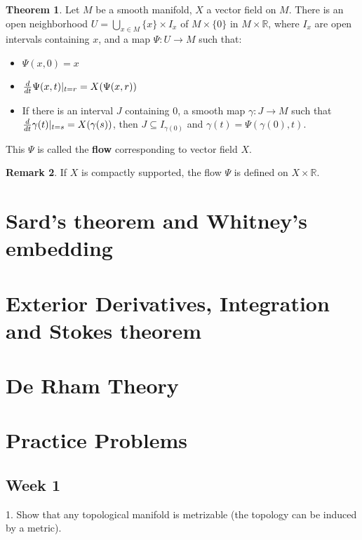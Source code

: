\documentclass{article}
\theoremstyle{definition}
\newtheorem{thm}{Theorem}[section]
\newtheorem{rmk}[thm]{Remark}
\begin{document}
\begin{thm}
    Let $M$ be a smooth manifold, $X$ a vector field on $M$. There is an open neighborhood $U=\bigcup_{x\in M}\{x\}\times I_x$ of $M\times \{0\}$ in $M\times \mathbb{R}$, where $I_x$ are open intervals containing $x$, and a map $\Psi: U\rightarrow M$ such that:
    \begin{itemize}
        \item $\Psi(x, 0)=x$
        \item ${d\over dt}\Psi(x, t)|_{t=r}=X(\Psi(x, r))$
        \item If there is an interval $J$ containing $0$, a smooth map $\gamma: J\rightarrow M$ such that ${d\over dt}\gamma(t)|_{t=s}=X(\gamma(s))$, then $J\subseteq I_{\gamma(0)}$ and $\gamma(t)=\Psi(\gamma(0), t)$.
    \end{itemize}
    This $\Psi$ is called the {\bf flow} corresponding to vector field $X$.
\end{thm}

\begin{rmk}
    If $X$ is compactly supported, the flow $\Psi$ is defined on $X\times\mathbb{R}$.
\end{rmk}


\newpage

\section{Sard's theorem and Whitney's embedding}

\section{Exterior Derivatives, Integration and Stokes theorem}

\section{De Rham Theory}

\newpage
\appendix

\section{Practice Problems}

\subsection{Week 1}

1. Show that any topological manifold is metrizable (the topology can be induced by a metric).\\
\end{document}
